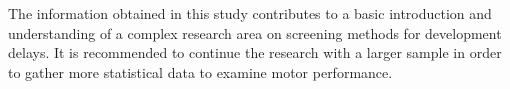 The information obtained in this study contributes to a basic introduction and understanding of a complex research area on screening methods for development delays. It is recommended to continue the research with a larger sample in order to gather more statistical data to examine motor performance.  





\hypersetup{pageanchor=false}